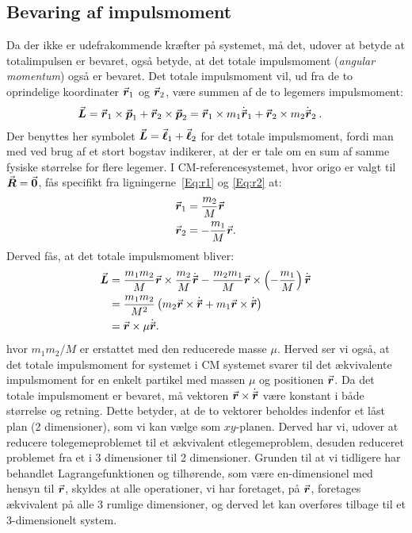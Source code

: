 \subsection{Bevaring af impulsmoment}
Da der ikke er udefrakommende kræfter på systemet, må det, udover at betyde at totalimpulsen er bevaret, også betyde, at det totale impulsmoment (\textit{angular momentum}) også er bevaret. Det totale impulsmoment vil, ud fra de to oprindelige koordinater ${\vec{\boldsymbol{r}}}_{\text{1}}$ og ${\vec{\boldsymbol{r}}}_{\text{2}}$, være summen af de to legemers impulsmoment:
\begin{align}
	{\vec{\boldsymbol{L}}} &= {\vec{\boldsymbol{r}}}_{\text{1}} \times {\vec{\boldsymbol{p}}}_{\text{1}} + {\vec{\boldsymbol{r}}}_{\text{2}} \times {\vec{\boldsymbol{p}}}_{\text{2}} = {\vec{\boldsymbol{r}}}_1 \times m_1\dot{{\vec{\boldsymbol{r}}}}_1+{\vec{\boldsymbol{r}}}_2 \times m_2\dot{{\vec{\boldsymbol{r}}}}_2 \: .
\end{align}
Der benyttes her symbolet ${\vec{\boldsymbol{L}}} = {\vec{\boldsymbol{\ell}}}_1 + {\vec{\boldsymbol{\ell}}}_2$ for det totale impulsmoment, fordi man med ved brug af et stort bogstav indikerer, at der er tale om en sum af samme fysiske størrelse for flere legemer. I CM-referencesystemet, hvor origo er valgt til ${\vec{\boldsymbol{R}}} = {\vec{\boldsymbol{0}}}$, fås specifikt fra ligningerne~\eqref{Eq:r1} og \eqref{Eq:r2} at:
\begin{align}
	{\vec{\boldsymbol{r}}}_{\text{1}} &= \frac{m_2}{M}{\vec{\boldsymbol{r}}} \\
	{\vec{\boldsymbol{r}}}_{\text{2}} &= -\frac{m_1}{M}{\vec{\boldsymbol{r}}}.
\end{align}
Derved fås, at det totale impulsmoment bliver:
\begin{equation}
\begin{aligned}
	{\vec{\boldsymbol{L}}} &= \frac{m_1 m_2}{M} {\vec{\boldsymbol{r}}} \times \frac{m_2}{M} \dot{{\vec{\boldsymbol{r}}}} - \frac{m_2 m_1}{M} {\vec{\boldsymbol{r}}} \times \left(-\frac{m_1}{M}\right) \dot{{\vec{\boldsymbol{r}}}} \\
	&= \frac{m_1m_2}{M^2}\left(m_2{\vec{\boldsymbol{r}}} \times \dot{{\vec{\boldsymbol{r}}}} + m_1 {\vec{\boldsymbol{r}}} \times \dot{{\vec{\boldsymbol{r}}}}\right) \\
	&= {\vec{\boldsymbol{r}}} \times \mu \dot{{\vec{\boldsymbol{r}}}}.
\end{aligned}
\end{equation}
hvor $m_1m_2/M$ er erstattet med den reducerede masse $\mu$. Herved ser vi også, at det totale impulsmoment for systemet i CM systemet svarer til det ækvivalente impulsmoment for en enkelt partikel med massen $\mu$ og positionen ${\vec{\boldsymbol{r}}}$. Da det totale impulsmoment er bevaret, må vektoren ${\vec{\boldsymbol{r}}} \times \dot{{\vec{\boldsymbol{r}}}}$ være konstant i både størrelse og retning. Dette betyder, at  de to vektorer beholdes indenfor et låst plan (2 dimensioner), som vi kan vælge som $xy$-planen. Derved har vi, udover at reducere tolegemeproblemet til et ækvivalent etlegemeproblem, desuden reduceret problemet fra et i 3 dimensioner til 2 dimensioner. Grunden til at vi tidligere har behandlet Lagrangefunktionen og tilhørende, som være en-dimensionel med hensyn til ${\vec{\boldsymbol{r}}}$, skyldes at alle operationer, vi har foretaget, på ${\vec{\boldsymbol{r}}}$, foretages ækvivalent på alle 3 rumlige dimensioner, og derved let kan overføres tilbage til et 3-dimensionelt system. \\
%
